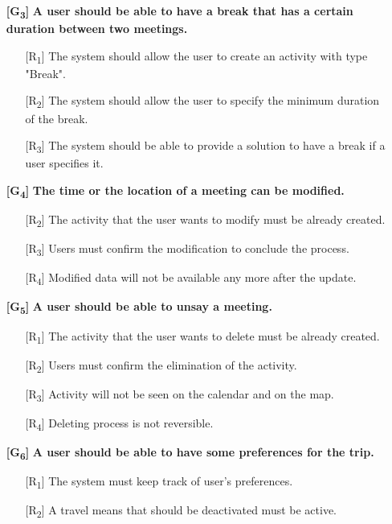 \documentclass[12pt,titlepage]{article}
\begin{document}
\begin{itemize}
\item[\textbf{ {[G\textsubscript{3}]}}]	\textbf{	A user should be able to have a break that has a certain duration between two meetings.}
\begin{itemize}
\item[{[R\textsubscript{1}]}]  The system should allow the user to create an activity with type "Break".
\item[{[R\textsubscript{2}]}]  The system should allow the user to specify the minimum duration of the break.
\item[{[R\textsubscript{3}]}]  The system should be able to provide a solution to have a break if a user specifies it.
\end{itemize}
\item[\textbf{ {[G\textsubscript{4}]}}]	\textbf{	The time or the location of a meeting can be modified.}
\begin{itemize}
\item[{[R\textsubscript{2}]}] The activity that the user wants to modify must be already created.
\item[{[R\textsubscript{3}]}] Users must confirm the modification to conclude the process.
\item[{[R\textsubscript{4}]}] Modified data will not be available any more after the update.
\end{itemize}
\item[\textbf{ {[G\textsubscript{5}]}}]	\textbf{	A user should be able to unsay a meeting.}
\begin{itemize}
\item[{[R\textsubscript{1}]}] The activity that the user wants to delete must be already created.
\item[{[R\textsubscript{2}]}] Users must confirm the elimination of the activity.
\item[{[R\textsubscript{3}]}] Activity will not be seen on the calendar and on the map.
\item[{[R\textsubscript{4}]}] Deleting process is not reversible.
\end{itemize}
\item[\textbf{ {[G\textsubscript{6}]}}]	\textbf{A user should be able to have some preferences for the trip.}
\begin{itemize}
\item[{[R\textsubscript{1}]}]  The system must keep track of user's preferences.
\item[{[R\textsubscript{2}]}] A travel means that should be deactivated must be active.

\end{itemize}
\end{itemize}
\end{document}
